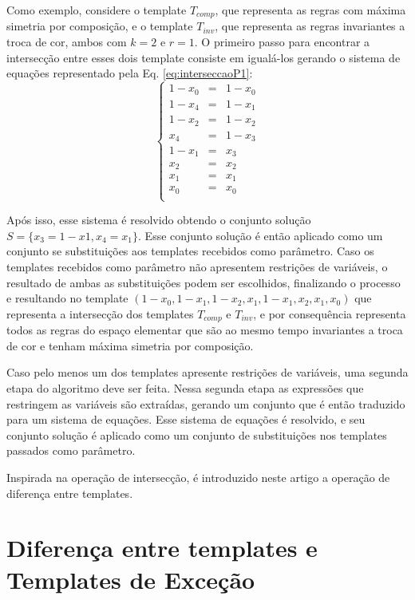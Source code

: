 \documentclass[12pt, a4paper]{article}
\begin{document}
Como exemplo, considere o template $T_{comp}$, que representa as regras com máxima simetria por composição, e o template $T_{inv}$, que representa as regras invariantes a troca de cor, ambos com $k=2$ e $r=1$. O primeiro passo para encontrar a intersecção entre esses dois template consiste em igualá-los gerando o sistema de equações representado pela Eq. \ref{eq:interseccaoP1}:
\begin{equation}
\left\{\begin{matrix}
1 - x_0	& = & 1 - x_0	\\
1 - x_4	& = & 1 - x_1	\\
1 - x_2	& = & 1 - x_2	\\
x_4		& = & 1 - x_3	\\
1 - x_1	& = & x_3		\\
x_2		& = & x_2		\\
x_1		& = & x_1		\\
x_0		& = & x_0		\\
\end{matrix}\right.
\label{eq:interseccaoP1}
\end{equation}

Após isso, esse sistema é resolvido obtendo o conjunto solução $S = \{x_3 = 1-x1, x_4 = x_1\}$. Esse conjunto solução é então aplicado como um conjunto se substituições aos templates recebidos como parâmetro. Caso os templates recebidos como parâmetro não apresentem restrições de variáveis, o resultado de ambas as substituições podem ser escolhidos, finalizando o processo e resultando no template $(1 - x_0, 1 - x_1, 1 - x_2, x_1, 1 - x_1, x_2, x_1, x_0)$ que representa a intersecção dos templates $T_{comp}$ e $T_{inv}$, e por consequência representa todos as regras do espaço elementar que são ao mesmo tempo invariantes a troca de cor e tenham máxima simetria por composição.

Caso pelo menos um dos templates apresente restrições de variáveis, uma segunda etapa do algoritmo deve ser feita. Nessa segunda etapa as expressões que restringem as variáveis são extraídas, gerando um conjunto que é então traduzido para um sistema de equações. Esse sistema de equações é resolvido, e seu conjunto solução é aplicado como um conjunto de substituições nos templates passados como parâmetro.

Inspirada na operação de intersecção, é introduzido neste artigo a operação de diferença entre templates.
\section{Diferença entre templates e Templates de Exceção}
\label{sec:diferenca_entre_templates_e_templates_de_excecao}
\end{document}
